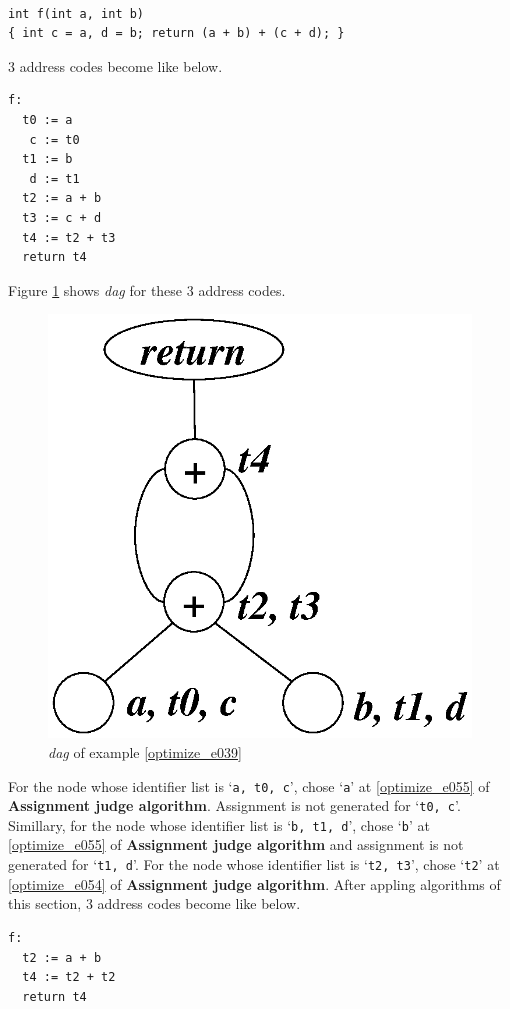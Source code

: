 \begin{Example}
\label{optimize_e039}
\begin{verbatim}

int f(int a, int b)
{ int c = a, d = b; return (a + b) + (c + d); }
\end{verbatim}
3 address codes become like below.
\begin{verbatim}
f:
  t0 := a
   c := t0
  t1 := b
   d := t1
  t2 := a + b
  t3 := c + d
  t4 := t2 + t3
  return t4
\end{verbatim}
Figure \ref{optimize_e040} shows {\em dag} for these 3 address codes.
\begin{figure}[htbp]
\begin{center}
\includegraphics[width=0.724\linewidth,height=0.7\linewidth]{opt021.eps}
\caption{{\em dag} of example \ref{optimize_e039}}
\label{optimize_e040}
\end{center}
\end{figure}
For the node whose identifier list is `{\tt{a, t0, c}}',
chose `{\tt{a}}' at \ref{optimize_e055} of {\bf Assignment judge algorithm}.
Assignment is not generated for `{\tt{t0, c}}'.
Simillary, for the node whose identifier list is `{\tt{b, t1, d}}',
chose `{\tt{b}}' at \ref{optimize_e055}
of {\bf Assignment judge algorithm} and
assignment is not generated for `{\tt{t1, d}}'.
For the node whose identifier list is `{\tt{t2, t3}}',
chose `{\tt{t2}}' at \ref{optimize_e054}
of {\bf Assignment judge algorithm}.
After appling algorithms of this section,
3 address codes become like below.
\begin{verbatim}
f:
  t2 := a + b
  t4 := t2 + t2
  return t4
\end{verbatim}
\end{Example}

